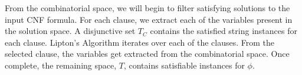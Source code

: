 From the combinatorial space, we will begin to filter satisfying solutions to the input CNF formula.  For each clause, we extract each of the variables present in the solution space.  A disjunctive set $T_C$ contains the satisfied string instances for each clause.  {\sc Lipton's Algorithm} iterates over each of the clauses.  From the selected clause, the variables get extracted from the combinatorial space.  Once complete, the remaining space, $T$, contains satisfiable instances for $\phi$.
%
%
%
%
%
%
%
	
